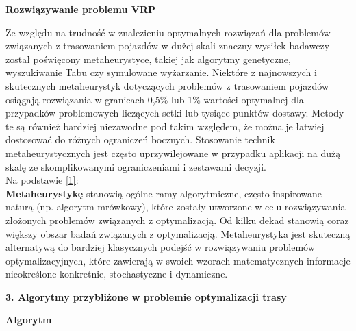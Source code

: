 \documentclass[a4paper, twoside, 12pt, justified]{article}
\begin{document}
	
	\begin{large}
		\begin{center}
			\textbf{Rozwiązywanie problemu VRP}
		\end{center}
	\end{large} 
	
	Ze względu na trudność w znalezieniu optymalnych rozwiązań dla problemów związanych z trasowaniem pojazdów w dużej skali znaczny wysiłek badawczy został poświęcony metaheurystyce, takiej jak algorytmy genetyczne, wyszukiwanie Tabu czy symulowane wyżarzanie. Niektóre z najnowszych i skutecznych metaheurystyk dotyczących problemów z trasowaniem pojazdów osiągają rozwiązania w granicach 0,5\% lub 1\% wartości optymalnej dla przypadków problemowych liczących setki lub tysiące punktów dostawy. Metody te są również bardziej niezawodne pod takim względem, że można je łatwiej dostosować do różnych ograniczeń bocznych. Stosowanie technik metaheurystycznych jest często uprzywilejowane w przypadku aplikacji na dużą skalę ze skomplikowanymi ograniczeniami i zestawami decyzji.\\
	
	Na podstawie \hyperlink{metaheurystyka}{[1]}:\\ 
	\textbf{Metaheurystykę} stanowią ogólne ramy algorytmiczne, często inspirowane naturą (np. algorytm mrówkowy), które zostały utworzone w celu rozwiązywania złożonych problemów związanych z optymalizacją. Od kilku dekad stanowią coraz większy obszar badań związanych z optymalizacją. Metaheurystyka jest skuteczną alternatywą
	do bardziej klasycznych podejść w rozwiązywaniu problemów optymalizacyjnych, które zawierają w swoich wzorach matematycznych informacje nieokreślone konkretnie, stochastyczne i dynamiczne.\\
	

	
	\newpage
	
	
	\begin{flushleft}
		\begin{LARGE}
			\textbf{3. Algorytmy przybliżone w problemie
				optymalizacji trasy}
		\end{LARGE}
	\end{flushleft}
	\vspace{5mm} %
	
	\begin{large}
		\begin{center}
			\textbf{Algorytm}
		\end{center}
	\end{large}
\end{document}
